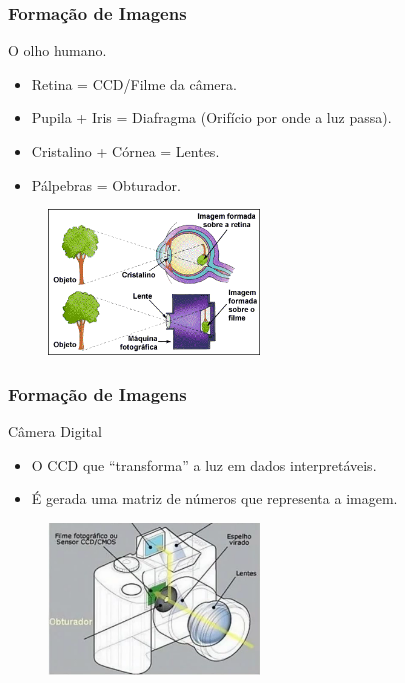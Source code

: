 \documentclass{beamer}
\begin{document}
\begin{frame}
\frametitle{Formação de Imagens}

	\begin{block}{O olho humano.}
		\begin{itemize}
			\item Retina = CCD/Filme da câmera.
			\item Pupila + Iris = Diafragma (Orifício por onde a luz passa).
			\item Cristalino + Córnea = Lentes.
			\item Pálpebras = Obturador.
		\end{itemize}
	\end{block}
	
	\begin{figure}[htb!]
  		\centering
      		\includegraphics[width=0.5\textwidth]{Figures/olho_humano}
  		\label{iep}
	\end{figure}

\end{frame}

\begin{frame}
\frametitle{Formação de Imagens}

	\begin{block}{Câmera Digital}
		\begin{itemize}
			\item O CCD que ``transforma'' a luz em dados interpretáveis.
			\item É gerada uma matriz de números que representa a imagem.
		\end{itemize}
	\end{block}
	
	\begin{figure}[htb!]
  		\centering
      		\includegraphics[width=0.5\textwidth]{Figures/cameraDigital}
  		\label{iep}
	\end{figure}

\end{frame}
\end{document}
